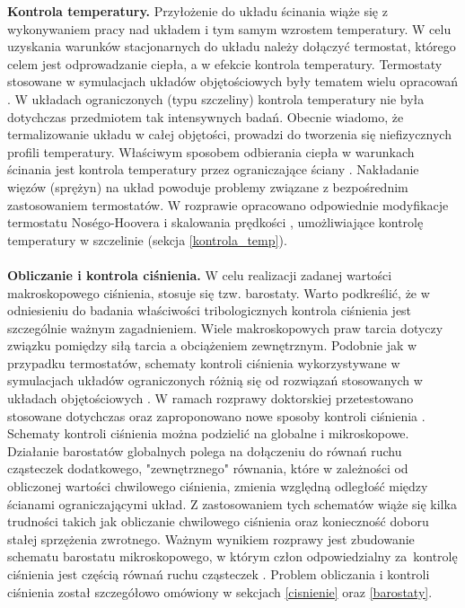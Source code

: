 \documentclass[12pt,a4paper,openright]{report} %
\begin{document}
\textbf{Kontrola temperatury.} Przyłożenie do układu ścinania wiąże się z wykonywaniem pracy nad układem i tym samym wzrostem temperatury. W celu uzyskania warunków stacjonarnych do układu należy dołączyć termostat, którego celem jest odprowadzanie ciepła, a w efekcie kontrola temperatury. Termostaty stosowane w symulacjach układów objętościowych były tematem wielu opracowań \cite{Nose1984, Hoover1985, Martyna1992, Branka2003, Branka2000, Braga2005, Andersen1980, Evans1983, Berendsen1984, Pieprzyk2015}. W układach ograniczonych \linebreak (typu szczeliny) kontrola temperatury nie była dotychczas przedmiotem tak intensywnych badań. Obecnie wiadomo, że termalizowanie układu w całej objętości, prowadzi do tworzenia się niefizycznych profili temperatury. Właściwym sposobem odbierania ciepła w warunkach ścinania jest kontrola temperatury przez ograniczające ściany \cite{DeLuca2014}. Nakładanie więzów (sprężyn) na układ powoduje problemy związane z bezpośrednim zastosowaniem termostatów. W rozprawie opracowano odpowiednie modyfikacje termostatu Nos\'{e}go-Hoovera \cite{Nose1984, Hoover1985} i skalowania prędkości \cite{Woodcock1971}, umożliwiające kontrolę temperatury w szczelinie (sekcja \ref{kontrola_temp}). 
\\
\\
\textbf{Obliczanie i kontrola ciśnienia.} W celu realizacji zadanej wartości makroskopowego ciśnienia, stosuje się tzw. barostaty. Warto podkreślić, że w odniesieniu do badania właściwości tribologicznych kontrola ciśnienia jest szczególnie ważnym zagadnieniem. Wiele makroskopowych praw tarcia dotyczy związku pomiędzy siłą tarcia a obciążeniem zewnętrznym. Podobnie jak w przypadku termostatów, schematy kontroli ciśnienia wykorzystywane w symulacjach układów ograniczonych różnią się od rozwiązań stosowanych w układach objętościowych \cite{andersen1980, ray82, Hoover86, ParrinelloRahman1980, ParrinelloRahman1981, QuigleyProbert2004, FallerdePablo02, UlineCortiI, EvansMorriss86, heyes1982}. W ramach rozprawy doktorskiej przetestowano stosowane dotychczas \cite{LupowskivanSwoll91a, LupowskivanSwoll91b, ButlerHarrowell2003, Pastewka2010} oraz zaproponowano nowe sposoby kontroli ciśnienia \cite{Gattinoni2014}. Schematy kontroli ciśnienia można podzielić na globalne i mikroskopowe. Działanie barostatów globalnych polega na dołączeniu do równań ruchu cząsteczek dodatkowego, "zewnętrznego" równania, które w zależności od obliczonej wartości chwilowego ciśnienia, zmienia względną odległość między ścianami ograniczającymi układ. Z zastosowaniem tych schematów wiąże się kilka trudności takich jak obliczanie chwilowego ciśnienia oraz konieczność doboru stałej sprzężenia zwrotnego. Ważnym wynikiem rozprawy jest zbudowanie schematu barostatu mikroskopowego, w którym człon odpowiedzialny za~kontrolę ciśnienia jest częścią równań ruchu cząsteczek \cite{Gattinoni2014}. Problem obliczania i kontroli ciśnienia został szczegółowo omówiony w sekcjach \ref{cisnienie} oraz \ref{barostaty}.\\
\end{document}
